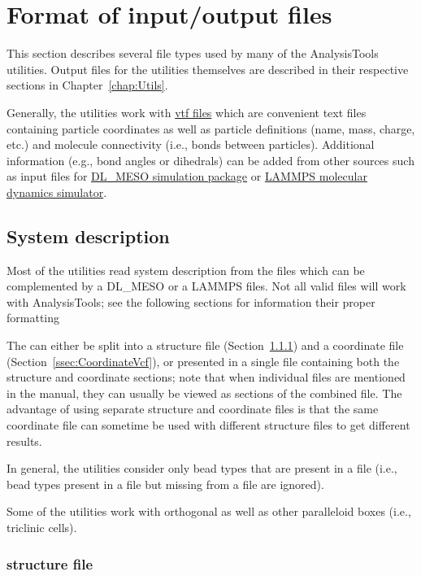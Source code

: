 \chapter{Format of input/output files}\label{chap:input}

This section describes several file types used by many of the
AnalysisTools utilities. Output files for the utilities themselves are
described in their respective sections in Chapter~\ref{chap:Utils}.

Generally, the utilities work with
\href{https://github.com/olenz/vtfplugin/wiki/VTF-format}{vtf files} which
are convenient text files containing particle coordinates as well as
particle definitions (name, mass, charge, etc.) and molecule connectivity
(i.e., bonds between particles). Additional information (e.g., bond angles
or dihedrals) can be added from other sources such as input files for
\href{https://www.scd.stfc.ac.uk/Pages/DL_MESO.aspx}{DL\_MESO simulation
package} or \href{https://lammps.sandia.gov/}{LAMMPS molecular dynamics
simulator}.

\section{System description} %
Most of the utilities read system description from the \vtf files
which can be complemented by a DL\_MESO \field or a LAMMPS \data files. Not
all valid \vtf files will work with AnalysisTools; see the following
sections for information their proper formatting

The \vtf can either be split into a \vsf structure file
(Section~\ref{ssec:StructureVsf}) and a \vcf coordinate file
(Section~\ref{ssec:CoordinateVcf}), or presented in a single \vtf file
containing both the structure and coordinate sections; note that when
individual \vscf files are mentioned in the manual, they can usually be
viewed as \vscf sections of the combined \vtf file. The advantage of using
separate structure and coordinate files is that the same coordinate file
can sometime be used with different structure files to get different
results.

In general, the utilities consider only bead types that are present in a
\vcf file (i.e., bead types present in a \vsf file but missing from a \vcf
file are ignored).

Some of the utilities work with orthogonal as well as other paralleloid
boxes (i.e., triclinic cells).

\subsection{\vsf structure file} \label{ssec:StructureVsf} %

